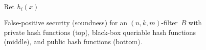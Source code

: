 \begin{figure}
{{\medskip
{}\\
Ret $h_i(x)$\\
} } \caption{False-positive security (soundness) for an
$(n,k,m)$-filter~$B$ with private hash functions (top), black-box
queriable hash functions (middle), and public hash functions
(bottom).  } \label{fig:fp-filter}
\end{figure}






